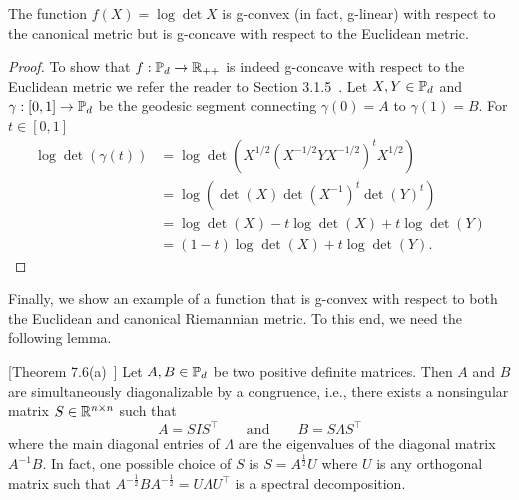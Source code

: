 \documentclass[twoside,11pt]{article}
\begin{document}
\begin{prop}\label{prop:prove_logdet_gcvx}
    The function  $f(X) = \log \det X$ is g-convex (in fact, g-linear) with respect to the canonical metric but is g-concave with respect to the Euclidean metric.
\end{prop}
\begin{proof}
    To show that $f:\mathbb{P}_d \to \mathbb{R}_{++}$ is indeed g-concave with respect to  
    the Euclidean metric we refer the reader to Section 3.1.5~\citep{Boyd_Vandenberghe_2004}. Let $X, Y \in \mathbb{P}_d$ and $\gamma:[0,1] \to \mathbb{P}_d$ be the geodesic segment connecting $\gamma(0) = A$ to $\gamma(1) = B$. For $t \in [0,1]$
    \[
    \begin{aligned}
         \log \det \left(\gamma(t) \right) &= \log \det \left(X^{1/2}(X^{-1/2}YX^{-1/2})^t X^{1/2} \right) 
            \\&= \log \left( \det(X) \det(X^{-1})^t \det(Y)^t \right) 
            \\&= \log \det(X) - t \log \det(X) + t \log \det(Y) 
            \\&= (1-t) \log \det (X) + t \log \det (Y).
    \end{aligned}
    \]
\end{proof}
Finally, we show an example of a function that is g-convex with respect to both the Euclidean and canonical Riemannian metric. To this end, we need the following lemma.

\begin{lemma}\label{lemma:diagonalize_pd}[Theorem 7.6(a)~\citep{horn_matrixanalysis}]
        Let $A, B \in \mathbb{P}_d$ be two positive definite matrices. Then $A$ and $B$ are simultaneously diagonalizable by a congruence, i.e., there exists a nonsingular matrix $S \in \mathbb{R}^{n \times n}$ such that 
        \[
        A = S I S^\top \qquad \text{and} \qquad B = S \Lambda S^\top
        \]
        where the main diagonal entries of $\Lambda$ are the eigenvalues of the diagonal matrix $A^{-1} B$. In fact, one possible choice of $S$ is $S = A^{\frac{1}{2}} U$ where $U$ is any orthogonal matrix such that $A^{-\frac{1}{2}}B A^{-\frac{1}{2}} = U \Lambda U^\top$ is a spectral decomposition.
    \end{lemma}
\end{document}
